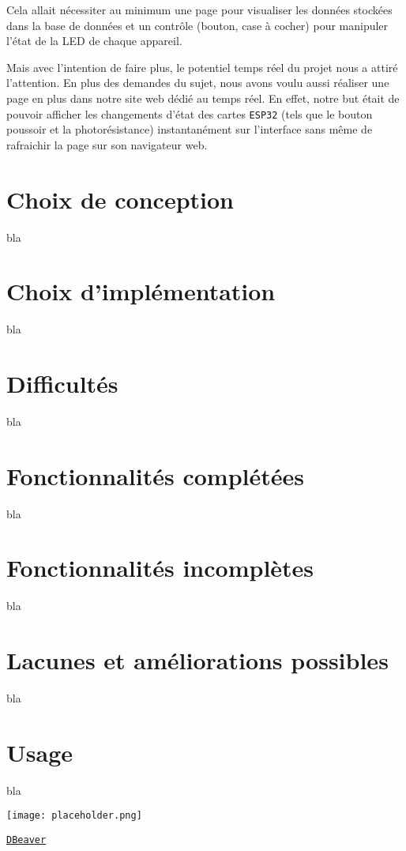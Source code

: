 \documentclass[12pt]{article}
\begin{document}
Cela allait nécessiter au minimum une page pour visualiser les données stockées dans la base de données et un contrôle
(bouton, case à cocher) pour manipuler l'état de la LED de chaque appareil.

Mais avec l'intention de faire plus, le potentiel temps réel du projet nous a attiré l'attention. En plus des demandes du sujet,
nous avons voulu aussi réaliser une page en plus dans notre site web dédié au temps réel. En effet, notre but était de
pouvoir afficher les changements d'état des cartes \texttt{ESP32} (tels que le bouton poussoir et la photorésistance)
instantanément sur l'interface sans même de rafraichir la page sur son navigateur web.

\section{Choix de conception}

bla

\section{Choix d'implémentation}

bla

\section{Difficultés}

bla

\section{Fonctionnalités complétées}

bla

\section{Fonctionnalités incomplètes}

bla

\section{Lacunes et améliorations possibles}

bla

\section{Usage}

bla

\begin{center}
	\texttt{[image: placeholder.png]}
\end{center}
\href{https://dbeaver.io/}{\texttt{DBeaver}}
\end{document}
